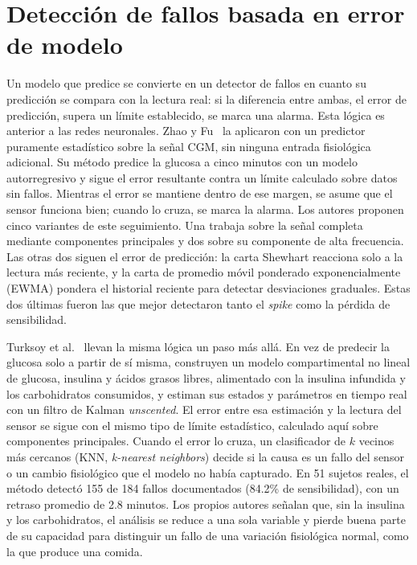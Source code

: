 \documentclass{report}
\begin{document}
\section{Detección de fallos basada en error de modelo}
\label{sec:deteccion_error_modelo}

Un modelo que predice se convierte en un detector de fallos en cuanto su predicción se compara con la lectura real: si la diferencia entre ambas, el error de predicción, supera un límite establecido, se marca una alarma. Esta lógica es anterior a las redes neuronales. Zhao y Fu~\cite{zhao2015statistical} la aplicaron con un predictor puramente estadístico sobre la señal CGM, sin ninguna entrada fisiológica adicional. Su método predice la glucosa a cinco minutos con un modelo autorregresivo y sigue el error resultante contra un límite calculado sobre datos sin fallos. Mientras el error se mantiene dentro de ese margen, se asume que el sensor funciona bien; cuando lo cruza, se marca la alarma. Los autores proponen cinco variantes de este seguimiento. Una trabaja sobre la señal completa mediante componentes principales y dos sobre su componente de alta frecuencia. Las otras dos siguen el error de predicción: la carta Shewhart reacciona solo a la lectura más reciente, y la carta de promedio móvil ponderado exponencialmente (EWMA) pondera el historial reciente para detectar desviaciones graduales. Estas dos últimas fueron las que mejor detectaron tanto el \textit{spike} como la pérdida de sensibilidad.

Turksoy et al.~\cite{turksoy2017} llevan la misma lógica un paso más allá. En vez de predecir la glucosa solo a partir de sí misma, construyen un modelo compartimental no lineal de glucosa, insulina y ácidos grasos libres, alimentado con la insulina infundida y los carbohidratos consumidos, y estiman sus estados y parámetros en tiempo real con un filtro de Kalman \textit{unscented}. El error entre esa estimación y la lectura del sensor se sigue con el mismo tipo de límite estadístico, calculado aquí sobre componentes principales. Cuando el error lo cruza, un clasificador de $k$ vecinos más cercanos (KNN, \textit{k-nearest neighbors}) decide si la causa es un fallo del sensor o un cambio fisiológico que el modelo no había capturado. En 51 sujetos reales, el método detectó 155 de 184 fallos documentados (84.2\% de sensibilidad), con un retraso promedio de 2.8 minutos. Los propios autores señalan que, sin la insulina y los carbohidratos, el análisis se reduce a una sola variable y pierde buena parte de su capacidad para distinguir un fallo de una variación fisiológica normal, como la que produce una comida.
\end{document}
